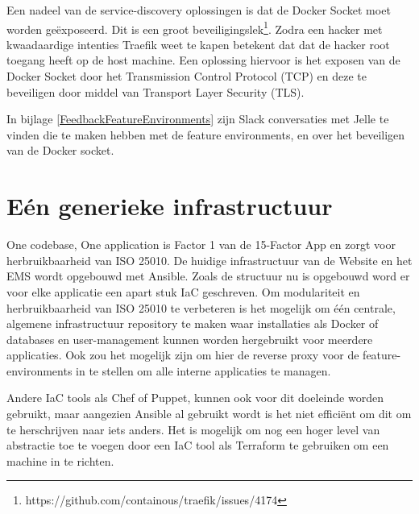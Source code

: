 Een nadeel van de service-discovery oplossingen is dat de Docker Socket moet worden geëxposeerd. Dit is een groot beveiligingslek\footnote{https://github.com/containous/traefik/issues/4174}. Zodra een hacker met kwaadaardige intenties Traefik weet te kapen betekent dat dat de hacker root toegang heeft op de host machine. Een oplossing hiervoor is het exposen van de Docker Socket door het Transmission Control Protocol (TCP) en deze te beveiligen door middel van Transport Layer Security (TLS).

In bijlage \ref{FeedbackFeatureEnvironments} zijn Slack conversaties met Jelle te vinden die te maken hebben met de feature environments, en over het beveiligen van de Docker socket.

\section{Eén generieke infrastructuur}
One codebase, One application is Factor 1 van de 15-Factor App en zorgt voor herbruikbaarheid van ISO 25010. De huidige infrastructuur van de Website en het EMS wordt opgebouwd met Ansible. Zoals de structuur nu is opgebouwd word er voor elke applicatie een apart stuk IaC geschreven. Om modulariteit en herbruikbaarheid van ISO 25010 \parencite{ISO25010} te verbeteren is het mogelijk om één centrale, algemene infrastructuur repository te maken waar installaties als Docker of databases en user-management kunnen worden hergebruikt voor meerdere applicaties. Ook zou het mogelijk zijn om hier de reverse proxy voor de feature-environments in te stellen om alle interne applicaties te managen.

Andere IaC tools als Chef of Puppet, kunnen ook voor dit doeleinde worden gebruikt, maar aangezien Ansible al gebruikt wordt is het niet efficiënt om dit om te herschrijven naar iets anders. Het is mogelijk om nog een hoger level van abstractie toe te voegen door een IaC tool als Terraform te gebruiken om een machine in te richten.

